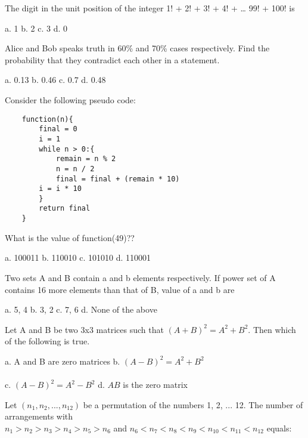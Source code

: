 \documentclass[a4paper, addpoints]{exam}
\begin{document}
\begin{questions}
	\question The digit in the unit position of the integer 1! + 2! + 3! + 4! + … 99! + 100! is \\
	
	\begin{oneparcheckboxes}
		\choice a. 1
		\choice b. 2
		\choice c. 3
		\choice d. 0
	\end{oneparcheckboxes}
	\question Alice and Bob speaks truth in 60\% and 70\% cases respectively. Find the probability that they contradict each other in a statement.\\
	
		\begin{oneparcheckboxes}
		\choice a. 0.13
		\choice b. 0.46
		\choice c. 0.7
		\choice d. 0.48
	\end{oneparcheckboxes}
	\question Consider the following pseudo code:
	\begin{verbatim}
	function(n){
		final = 0
		i = 1
		while n > 0:{
			remain = n % 2
			n = n / 2
			final = final + (remain * 10)
		i = i * 10
		}
		return final
	}
	\end{verbatim}
	What is the value of function(49)??\\
	
	\begin{oneparcheckboxes}
		\choice a. 100011
		\choice b. 110010
		\choice c. 101010
		\choice d. 110001
	\end{oneparcheckboxes}
	
	\question Two sets A and B contain a and b elements respectively. If power set of A contains 16 more elements than that of B, value of a and b are\\

	\begin{oneparcheckboxes}
		\choice a. 5, 4
		\choice b. 3, 2
		\choice c. 7, 6
		\choice d. None of the above
	\end{oneparcheckboxes}
	\question Let A and B be two 3x3 matrices such that $(A+B)^2 = A^2 + B^2.$ Then which of the following is true.\\
	
	\begin{oneparcheckboxes}
		\choice a. A and B are zero matrices
		\choice b. $(A - B)^2 = A^2 + B^2$\\\\
		\choice c. $(A - B)^2 = A^2 - B^2$
		\choice d. $AB$ is the zero matrix
	\end{oneparcheckboxes}
	\question Let $(n_1, n_2, ... , n_{12})$ be a permutation of the numbers 1, 2, ... 12. The number of arrangements with \\ $n_1>n_2>n_3>n_4>n_5>n_6$  and  $n_6<n_7<n_8<n_9<n_{10}<n_{11}<n_{12}$ equals:\\
	

\end{questions}
\end{document}
